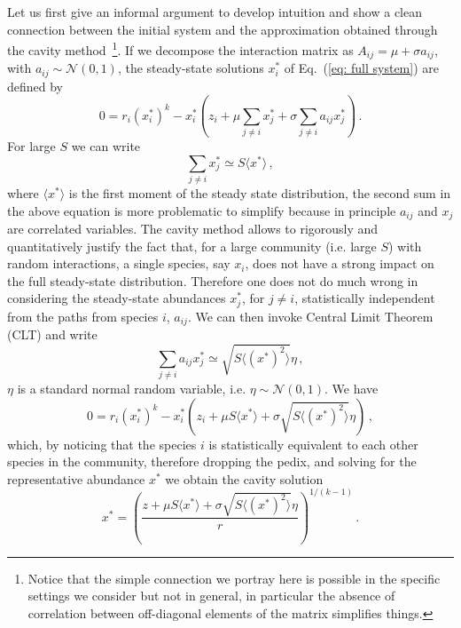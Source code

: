 \documentclass[10pt]{article}
\begin{document}
Let us first give an informal argument to develop intuition and show
a clean connection between the initial system and the approximation
obtained through the cavity method~\footnote{Notice that the simple 
connection we portray here is possible in the specific settings
we consider but not in general, in particular the absence of correlation
between off-diagonal elements of the matrix simplifies things.}.
If we decompose the interaction matrix as $A_{ij}=\mu + \sigma a_{ij}$,
with $a_{ij}\sim \mathcal{N}(0,1)$, the steady-state solutions $x_i^*$ of
Eq.~(\ref{eq: full system}) are defined by
\begin{equation}
    0 = r_i(x_i^*)^k - x_i^*\left(z_i + \mu\sum_{j\neq i}x_j^* + \sigma\sum_{j\neq i}a_{ij}x_j^*\right)\, .
\end{equation}
For large $S$ we can write 
\begin{equation}
    \sum_{j\neq i}x_j^* \simeq S\langle x^* \rangle\, ,
\end{equation}
where $\langle x^* \rangle$ is the first moment of the steady state distribution,
the second sum in the above equation is more problematic to simplify 
because in principle $a_{ij}$ and $x_j$ are correlated variables.
The cavity method allows to rigorously and quantitatively justify 
the fact that, for a large community (i.e. large $S$) with random interactions,
a single species, say $x_i$, does not have a strong impact
on the full steady-state distribution. 
Therefore one does not do much wrong in
considering the steady-state abundances $x_j^*$, for $j\neq i$,
statistically independent from the paths from species $i$, $a_{ij}$.
We can then invoke Central Limit Theorem (CLT) and write
\begin{equation}
    \sum_{j\neq i}a_{ij}x_j^*\simeq \sqrt{S\langle (x^*)^2 \rangle}\eta \, ,
\end{equation}
$\eta$ is a standard normal random variable, i.e. $\eta\sim\mathcal N (0,1)$.
We have 
\begin{equation}
    0 = r_i(x_i^*)^k - x_i^*\left(z_i + \mu S\langle x^* \rangle + \sigma\sqrt{S\langle (x^*)^2 \rangle}\eta\right)\, ,
\end{equation}
which, by noticing that the species $i$ is statistically equivalent to each other species
in the community, therefore dropping the pedix, 
and solving for the representative abundance $x^*$ we obtain the cavity solution
\begin{equation}
    x^* = \left(\frac{z + \mu S \langle x^* \rangle + \sigma \sqrt{S\langle (x^*)^2\rangle} \eta}
    {r}\right)^{1/(k-1)} \, .
    \label{eq: cavity solution}
\end{equation}
\end{document}
